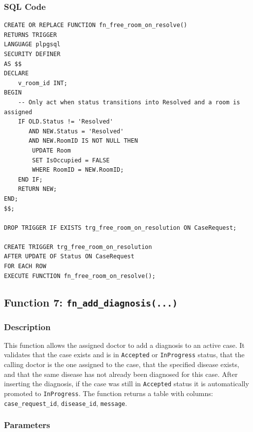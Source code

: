 \documentclass{article}
\begin{document}
\subsubsection{SQL Code}

\begin{lstlisting}
CREATE OR REPLACE FUNCTION fn_free_room_on_resolve()
RETURNS TRIGGER
LANGUAGE plpgsql
SECURITY DEFINER
AS $$
DECLARE
    v_room_id INT;
BEGIN
    -- Only act when status transitions into Resolved and a room is assigned
    IF OLD.Status != 'Resolved'
       AND NEW.Status = 'Resolved'
       AND NEW.RoomID IS NOT NULL THEN
        UPDATE Room
        SET IsOccupied = FALSE
        WHERE RoomID = NEW.RoomID;
    END IF;
    RETURN NEW;
END;
$$;

DROP TRIGGER IF EXISTS trg_free_room_on_resolution ON CaseRequest;

CREATE TRIGGER trg_free_room_on_resolution
AFTER UPDATE OF Status ON CaseRequest
FOR EACH ROW
EXECUTE FUNCTION fn_free_room_on_resolve();
\end{lstlisting}

\vspace{1em}


\subsection{Function 7: \texttt{fn\_add\_diagnosis(...)}}

\subsubsection{Description}
This function allows the assigned doctor to add a diagnosis to an active case. It validates that the case exists and is in \texttt{Accepted} or \texttt{InProgress} status, that the calling doctor is the one assigned to the case, that the specified disease exists, and that the same disease has not already been diagnosed for this case. After inserting the diagnosis, if the case was still in \texttt{Accepted} status it is automatically promoted to \texttt{InProgress}. The function returns a table with columns: \texttt{case\_request\_id}, \texttt{disease\_id}, \texttt{message}.

\subsubsection{Parameters}
\end{document}
